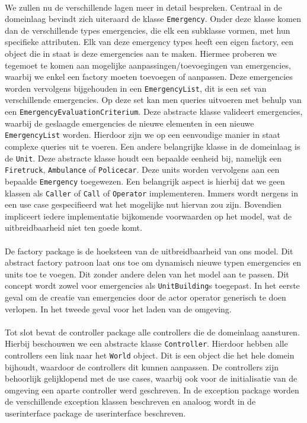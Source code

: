 \documentclass[a4paper, titlepage,12pt]{article}
\begin{document}
\paragraph{}
We zullen nu de verschillende lagen meer in detail bespreken. Centraal in de domeinlaag bevindt zich uiteraard de klasse \verb+Emergency+. Onder deze klasse komen dan de verschillende types emergencies, die elk een subklasse vormen, met hun specifieke attributen. Elk van deze emergency types heeft een eigen factory, een object die in staat is deze emergencies aan te maken. Hiermee proberen we tegemoet te komen aan mogelijke aanpassingen/toevoegingen van emergencies, waarbij we enkel een factory moeten toevoegen of aanpassen. Deze emergencies worden vervolgens bijgehouden in een \verb+EmergencyList+, dit is een set van verschillende emergencies. Op deze set kan men queries uitvoeren met behulp van een \verb+EmergencyEvaluationCriterium+. Deze abstracte klasse valideert emergencies, waarbij de geslaagde emergencies de nieuwe elementen in een nieuwe \verb+EmergencyList+ worden. Hierdoor zijn we op een eenvoudige manier in staat complexe queries uit te voeren. Een andere belangrijke klasse in de domeinlaag is de \verb+Unit+. Deze abstracte klasse houdt een bepaalde eenheid bij, namelijk een \verb+Firetruck+, \verb+Ambulance+ of \verb+Policecar+. Deze units worden vervolgens aan een bepaalde \verb+Emergency+ toegewezen. Een belangrijk aspect is hierbij dat we geen klassen als \verb+Caller+ of \verb+Call+ of \verb+Operator+ implementeren. Immers wordt nergens in een use case gespecifieerd wat het mogelijke nut hiervan zou zijn. Bovendien impliceert iedere implementatie bijkomende voorwaarden op het model, wat de uitbreidbaarheid niet ten goede komt.
\paragraph{}
De factory package is de hoeksteen van de uitbreidbaarheid van ons model. Dit abstract factory patroon laat ons toe om dynamisch nieuwe typen emergencies en units toe te voegen. Dit zonder andere delen van het model aan te passen. Dit concept wordt zowel voor emergencies als \verb+UnitBuilding+s toegepast. In het eerste geval om de creatie van emergencies door de actor operator generisch te doen verlopen. In het tweede geval voor het laden van de omgeving.
\paragraph{}
Tot slot bevat de controller package alle controllers die de domeinlaag aansturen. Hierbij beschouwen we een abstracte klasse \verb+Controller+. Hierdoor hebben alle controllers een link naar het \verb+World+ object. Dit is een object die het hele domein bijhoudt, waardoor de controllers dit kunnen aanpassen. De controllers zijn behoorlijk gelijklopend met de use cases, waarbij ook voor de initialisatie van de omgeving een aparte controller werd geschreven. In de exception package worden de verschillende exception klassen beschreven en analoog wordt in de userinterface package de userinterface beschreven.
\newpage
\end{document}
